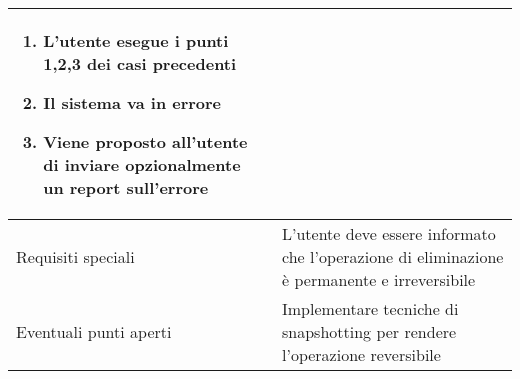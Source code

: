 \documentclass[../../main.tex]{subfiles}
\begin{document}
\begin{tabularx}{150mm}{|l|X|}
    \begin{enumerate}
        \item L'utente esegue i punti 1,2,3 dei casi precedenti
        \item Il sistema va in errore
        \item Viene proposto all'utente di inviare opzionalmente un report sull'errore
    \end{enumerate} \\
    \hline
    Requisiti speciali                  &    L'utente deve essere informato che l'operazione di eliminazione è permanente e irreversibile \\
    \hline
    Eventuali punti aperti              &    Implementare tecniche di snapshotting per rendere l'operazione reversibile\\
    \hline
\end{tabularx}
\newpage
\end{document}
